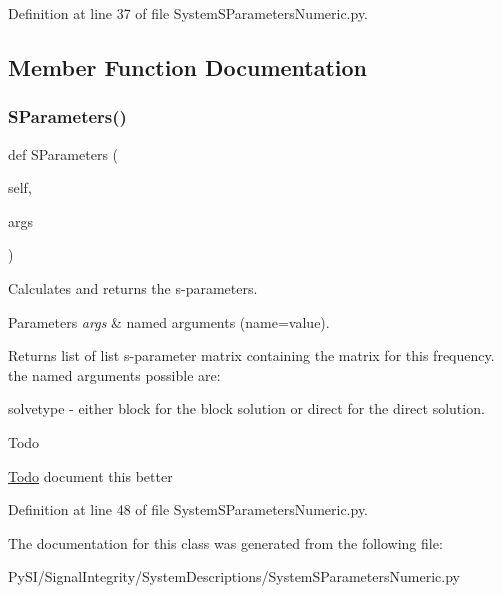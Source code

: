 Definition at line 37 of file System\+S\+Parameters\+Numeric.\+py.



\subsection{Member Function Documentation}
\mbox{\label{classSignalIntegrity_1_1SystemDescriptions_1_1SystemSParametersNumeric_1_1SystemSParametersNumeric_a021c12a7e391dbcb5904bb9a1e3c6294}} 
\subsubsection{\texorpdfstring{S\+Parameters()}{SParameters()}}
{\footnotesize\ttfamily def S\+Parameters (\begin{DoxyParamCaption}\item[{}]{self,  }\item[{}]{args }\end{DoxyParamCaption})}



Calculates and returns the s-\/parameters. 


\begin{DoxyParams}{Parameters}
{\em args} & named arguments (name=value). \\
\hline
\end{DoxyParams}
\begin{DoxyReturn}{Returns}
list of list s-\/parameter matrix containing the matrix for this frequency. the named arguments possible are\+:
\begin{DoxyItemize}
\item \textquotesingle{}solvetype\textquotesingle{} -\/ either \textquotesingle{}block\textquotesingle{} for the block solution or \textquotesingle{}direct\textquotesingle{} for the direct solution. 
\end{DoxyItemize}
\end{DoxyReturn}
\begin{DoxyRefDesc}{Todo}
\item[\hyperlink{todo__todo000017}{Todo}]document this better \end{DoxyRefDesc}


Definition at line 48 of file System\+S\+Parameters\+Numeric.\+py.



The documentation for this class was generated from the following file\+:\begin{DoxyCompactItemize}
\item 
Py\+S\+I/\+Signal\+Integrity/\+System\+Descriptions/System\+S\+Parameters\+Numeric.\+py\end{DoxyCompactItemize}
